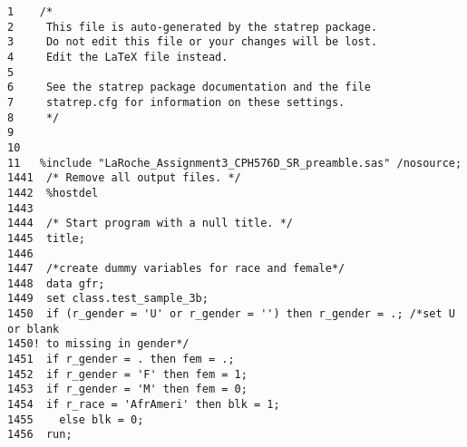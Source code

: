 \documentclass{article}\usepackage[]{graphicx}\usepackage[]{color}
\begin{document}
\begin{verbatim}
1    /*
2     This file is auto-generated by the statrep package.
3     Do not edit this file or your changes will be lost.
4     Edit the LaTeX file instead.
5
6     See the statrep package documentation and the file
7     statrep.cfg for information on these settings.
8     */
9
10
11   %include "LaRoche_Assignment3_CPH576D_SR_preamble.sas" /nosource;
1441  /* Remove all output files. */
1442  %hostdel
1443
1444  /* Start program with a null title. */
1445  title;
1446
1447  /*create dummy variables for race and female*/
1448  data gfr;
1449  set class.test_sample_3b;
1450  if (r_gender = 'U' or r_gender = '') then r_gender = .; /*set U or blank
1450! to missing in gender*/
1451  if r_gender = . then fem = .;
1452  if r_gender = 'F' then fem = 1;
1453  if r_gender = 'M' then fem = 0;
1454  if r_race = 'AfrAmeri' then blk = 1;
1455    else blk = 0;
1456  run;


\end{verbatim}
\end{document}
